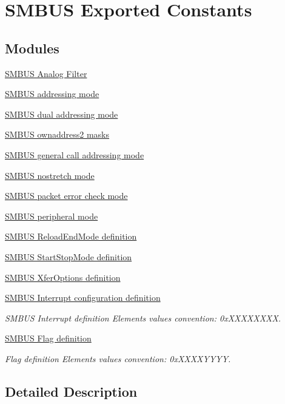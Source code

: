 \hypertarget{group___s_m_b_u_s___exported___constants}{}\section{S\+M\+B\+US Exported Constants}
\label{group___s_m_b_u_s___exported___constants}
\subsection*{Modules}
\begin{DoxyCompactItemize}
\item 
\hyperlink{group___s_m_b_u_s___analog___filter}{S\+M\+B\+U\+S Analog Filter}
\item 
\hyperlink{group___s_m_b_u_s__addressing__mode}{S\+M\+B\+U\+S addressing mode}
\item 
\hyperlink{group___s_m_b_u_s__dual__addressing__mode}{S\+M\+B\+U\+S dual addressing mode}
\item 
\hyperlink{group___s_m_b_u_s__own__address2__masks}{S\+M\+B\+U\+S ownaddress2 masks}
\item 
\hyperlink{group___s_m_b_u_s__general__call__addressing__mode}{S\+M\+B\+U\+S general call addressing mode}
\item 
\hyperlink{group___s_m_b_u_s__nostretch__mode}{S\+M\+B\+U\+S nostretch mode}
\item 
\hyperlink{group___s_m_b_u_s__packet__error__check__mode}{S\+M\+B\+U\+S packet error check mode}
\item 
\hyperlink{group___s_m_b_u_s__peripheral__mode}{S\+M\+B\+U\+S peripheral mode}
\item 
\hyperlink{group___s_m_b_u_s___reload_end_mode__definition}{S\+M\+B\+U\+S Reload\+End\+Mode definition}
\item 
\hyperlink{group___s_m_b_u_s___start_stop_mode__definition}{S\+M\+B\+U\+S Start\+Stop\+Mode definition}
\item 
\hyperlink{group___s_m_b_u_s___xfer_options__definition}{S\+M\+B\+U\+S Xfer\+Options definition}
\item 
\hyperlink{group___s_m_b_u_s___interrupt__configuration__definition}{S\+M\+B\+U\+S Interrupt configuration definition}
\begin{DoxyCompactList}\small\item\em S\+M\+B\+US Interrupt definition Elements values convention\+: 0x\+X\+X\+X\+X\+X\+X\+XX. \end{DoxyCompactList}\item 
\hyperlink{group___s_m_b_u_s___flag__definition}{S\+M\+B\+U\+S Flag definition}
\begin{DoxyCompactList}\small\item\em Flag definition Elements values convention\+: 0x\+X\+X\+X\+X\+Y\+Y\+YY. \end{DoxyCompactList}\end{DoxyCompactItemize}


\subsection{Detailed Description}
